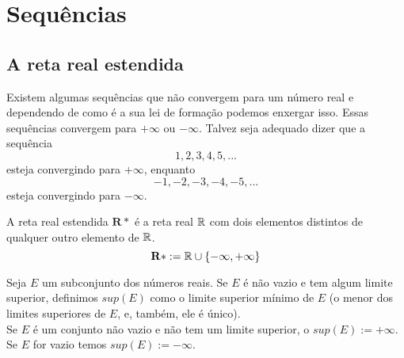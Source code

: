 \section{Sequências}
   \subsection{A reta real estendida}
      Existem algumas sequências que não convergem para um número 
      real e dependendo de como é a sua lei de formação podemos 
      enxergar isso. Essas sequências convergem para $+\infty$ ou 
      $-\infty$. Talvez seja adequado dizer que a sequência 
      $$1,2,3,4,5,...$$ esteja convergindo para $+\infty$, 
      enquanto $$-1,-2,-3,-4,-5,...$$ esteja convergindo 
      para $-\infty$.
      \begin{definition}
         A reta real estendida $\mathbf{R*}$ é a reta real $\mathbb{R}$ com dois elementos 
         distintos de qualquer outro elemento de $\mathbb{R}$.
         $$\mathbf{R*} := \mathbb{R} \cup \{-\infty,+\infty\}$$
      \end{definition}
      \begin{definition}[Supremo]
         Seja $E$ um subconjunto dos números reais. Se $E$ é não vazio 
         e tem algum limite superior, definimos $sup(E)$ como o 
         limite superior mínimo de $E$ (o menor dos limites superiores de $E$, e, 
         também, ele é único).\\
         Se $E$ é um conjunto não vazio e não tem um limite superior, o 
         $sup(E) := +\infty$. Se $E$ for vazio temos $sup(E) := -\infty$.
      \end{definition}

